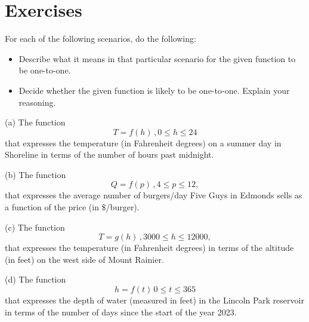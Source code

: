 \documentclass{ximera}
\begin{document}
\section*{Exercises}

\begin{exercise}   \label{Ex:LKdjfgd}
For each of the following scenarios, do the following:

\begin{itemize}
\item{Describe what it means in that particular scenario for the given function to be one-to-one.}

\item{Decide whether the given function is likely to be one-to-one. Explain your reasoning.}
\end{itemize}

(a) The function 
\[
     T = f(h)  \, , 0\leq h \leq 24
\]
that expresses the temperature (in Fahrenheit degrees) on a summer day in Shoreline in terms of the number of hours past midnight.

(b) The function
\[
     Q = f(p) \, , 4\leq p \leq 12 ,
\]
that expresses the average number of burgers/day Five Guys in Edmonds sells as a function of the price (in $\$$/burger).

(c) The function
\[
     T = g(h) \, , 3000\leq h \leq 12000 ,
\]
that expresses the temperature (in Fahrenheit degrees) in terms of the altitude (in feet) on the west side of Mount Rainier.

(d) The function 
\[
   h = f(t) \, 0\leq t \leq 365
\]
that expresses the depth of water (measured in feet) in the Lincoln Park reservoir in terms of the number of days since the start of the year 2023. 

\end{exercise}
\end{document}
